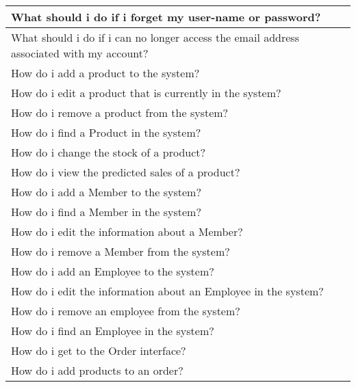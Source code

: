 \begin{center}
\begin{longtable}{|p{8cm}|p{3cm}|}
		What should i do if i forget my user-name or password?&  \pageref{fig:Forgetting Your User-name or Password} \\ \hline
	What should i do if i can no longer access the email address associated with my account? &  \pageref{fig:Unable to access your email address} \\ \hline
	How do i add a product to the system? &  \pageref{fig:Adding a Product to the system} \\ \hline
	How do i edit a product that is currently in the system?&  \pageref{fig:Editing a Product in the system} \\ \hline
	How do i remove a product from the system?&  \pageref{fig:Removing a Product from the system} \\ \hline
	How do i find a Product in the system?&  \pageref{fig:Finding a Product within the system} \\ \hline
	How do i change the stock of a product?&  \pageref{fig:Changing the stock of a Product} \\ \hline
	How do i view the predicted sales of a product?&  \pageref{fig:Product Stock Prediction} \\ \hline
	How do i add a Member to the system?&  \pageref{fig:Adding a Member to the system} \\ \hline
	How do i find a Member in the system?&  \pageref{fig:Finding a Member in the system} \\ \hline
	How do i edit the information about a Member?&  \pageref{fig:Editing a Member currently in the system} \\ \hline
	How do i remove a Member from the system?&  \pageref{fig:Removing a Member from the system} \\ \hline
	How do i add an Employee to the system?&  \pageref{fig:Adding an Employee to the system} \\ \hline
	How do i edit the information about an Employee in the system?&  \pageref{fig:Editing an Employee in the system} \\ \hline
	How do i remove an employee from the system?&  \pageref{fig:Removing an Employee for the system.} \\ \hline
	How do i find an Employee in the system?&  \pageref{fig:Finding an Employee in the system} \\ \hline
	How do i get to the Order interface?&  \pageref{fig:Creating an Order} \\ \hline
	How do i add products to an order?&  \pageref{fig:Adding products to an order} \\ \hline

\end{longtable}
\end{center}
